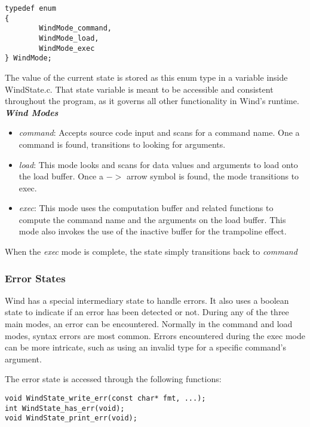 \begin{lstlisting}[style=customc]
typedef enum
{
        WindMode_command,
        WindMode_load,
        WindMode_exec
} WindMode;
\end{lstlisting} 

The value of the current state is stored as this enum type in a  variable inside WindState.c. That state variable is meant to be accessible and consistent throughout the program, as it governs all other functionality in Wind's runtime. \\

\textbf{\emph{Wind Modes}}
\begin{itemize}
\item \emph{command}: Accepts source code input and scans for a command name. One a command is found, transitions to looking for arguments.
\item \emph{load}: This mode looks and scans for data values and arguments to load onto the load buffer. Once a $->$ arrow symbol is found, the mode transitions to exec.
\item \emph{exec}: This mode uses the computation buffer and related functions to compute the command name and the arguments on the load buffer. This mode also invokes the use of the inactive buffer for the trampoline effect.
\end{itemize}

\par When the \emph{exec} mode is complete, the state simply transitions back to \emph{command}

\subsubsection{Error States}

\par Wind has a special intermediary state to handle errors. It also uses a  boolean state to indicate if an error has been detected or not. During any of the three main modes, an error can be encountered. Normally in the command and load modes, syntax errors are most common. Errors encountered during the exec mode can be more intricate, such as using an invalid type for a specific command's argument.

The error state is accessed through the following functions:

\begin{lstlisting}[style=customc]
void WindState_write_err(const char* fmt, ...);
int WindState_has_err(void);
void WindState_print_err(void);
\end{lstlisting}

